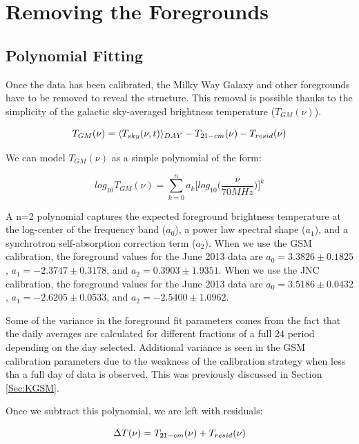 \section{Removing the Foregrounds}\label{Sec:fore}

\subsection{Polynomial Fitting}
Once the data has been calibrated, the Milky Way Galaxy and other foregrounds have to be removed to reveal the \cm structure. This removal is possible thanks to the simplicity of the galactic sky-averaged brightness temperature ($T_{GM}(\nu)$). 

\begin{equation}
T_{GM}(\nu) = \langle T_{sky}(\nu,t) \rangle_{DAY} - T_{21-cm} (\nu) - T_{resid} (\nu)
\end{equation}

We can model $T_{GM} (\nu)$ as a simple polynomial of the form:

\begin{equation}
log_{10} T_{GM}(\nu) = \sum_{k=0}^n a_k \Big[ log_{10} \Big(\frac{\nu}{70 MHz}\Big) \Big]^k
\end{equation}

A n=2 polynomial captures the expected foreground brightness temperature at the log-center of the frequency band ($a_0$), a power law spectral shape ($a_1$), and a synchrotron self-absorption correction term ($a_2$). When we use the GSM calibration, the foreground values for the June 2013 data are $a_0 = 3.3826 \pm 0.1825$, $a_1 = -2.3747 \pm 0.3178$, and $a_2 = 0.3903 \pm 1.9351$. When we use the JNC calibration, the foreground values for the June 2013 data are $a_0 = 3.5186 \pm 0.0432$, $a_1 = -2.6205 \pm 0.0533$, and $a_2 = -2.5400 \pm 1.0962$. 

Some of the variance in the foreground fit parameters comes from the fact that the daily averages are calculated for different fractions of a full 24 period depending on the day selected. Additional variance is seen in the GSM calibration parameters due to the weakness of the calibration strategy when less tha a full day of data is observed. This was previously discussed in Section \ref{Sec:KGSM}.

Once we subtract this polynomial, we are left with residuals:

\begin{equation}
\Delta T (\nu) = T_{21-cm}(\nu)+T_{resid}(\nu)
\end{equation}

